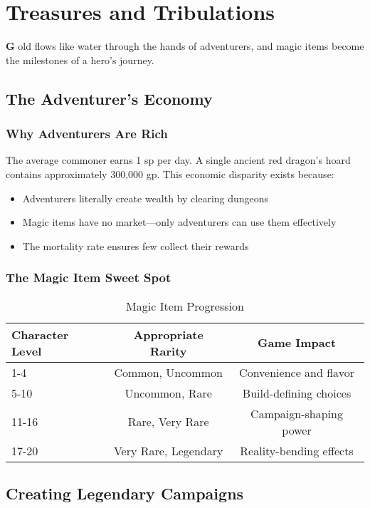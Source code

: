 \documentclass[11pt,letterpaper,openany]{book}
\newcommand{\firstletter}[1]{%
    \textcolor{bloodred}{\fontsize{48}{48}\selectfont\bfseries #1}%
}
\begin{document}
\chapter{Treasures and Tribulations}

\firstletter{G}old flows like water through the hands of adventurers, and magic items become the milestones of a hero's journey.

\section{The Adventurer's Economy}

\subsection{Why Adventurers Are Rich}

The average commoner earns 1 sp per day. A single ancient red dragon's hoard contains approximately 300,000 gp. This economic disparity exists because:
\begin{itemize}
    \item Adventurers literally create wealth by clearing dungeons
    \item Magic items have no market—only adventurers can use them effectively
    \item The mortality rate ensures few collect their rewards
\end{itemize}

\subsection{The Magic Item Sweet Spot}

\begin{table}[h]
\centering
\begin{tabular}{@{}lcc@{}}
\toprule
\textbf{Character Level} & \textbf{Appropriate Rarity} & \textbf{Game Impact} \\
\midrule
1-4 & Common, Uncommon & Convenience and flavor \\
5-10 & Uncommon, Rare & Build-defining choices \\
11-16 & Rare, Very Rare & Campaign-shaping power \\
17-20 & Very Rare, Legendary & Reality-bending effects \\
\bottomrule
\end{tabular}
\caption{Magic Item Progression}
\end{table}

\section{Creating Legendary Campaigns}
\end{document}
